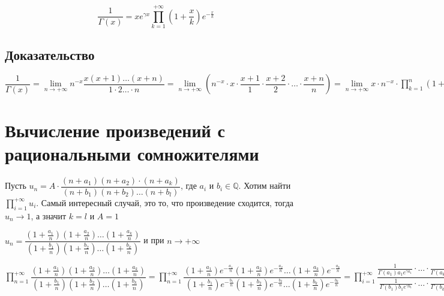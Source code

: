 \documentclass{article}
\begin{document}
            $$\dfrac{1}{\Gamma(x)} = x e^{\gamma x} \prod\limits^{+\infty}_{k = 1} \left( 1 + \dfrac{x}{k} \right) e^{-\frac{x}{k}}$$
            
        \subsection{Доказательство}
        
            $\dfrac{1}{\Gamma(x)} = \lim\limits_{n \rightarrow +\infty} n^{-x} \dfrac{x(x+1)\ldots(x+n)}{1 \cdot 2 \ldots \cdot n} = \lim\limits_{n \rightarrow +\infty} \left( n^{-x} \cdot x \cdot \dfrac{x + 1}{1} \cdot \dfrac{x + 2}{2} \cdot \ldots \cdot \dfrac{x + n}{n} \right) = \lim\limits_{n \rightarrow +\infty} x \cdot n^{-x} \cdot \prod^n_{k = 1} \left( 1 + \frac{x}{k} \right) = \lim\limits_{n \rightarrow +\infty} x e^{x \left(1 + \frac{1}{2} + \ldots + \frac{1}{n} \right)} \cdot e^{-x \ln n} \prod^n_{k = 1} \left( 1 + \dfrac{x}{k} \right) e^{-\frac{x}{k}} = x \cdot e^{\gamma x} \prod^{+\infty}_{k = 1} \left( 1 + \dfrac{x}{k} \right) e^{-\frac{x}{k}}$
            
    \newpage
    
    \section{Вычисление произведений с рациональными сомножителями}

        Пусть $u_n = A \cdot \dfrac{(n + a_1) (n + a_2) \cdot (n + a_k)}{(n + b_1) (n + b_2) \ldots (n + b_l)}$, где $a_i$ и $b_i \in \mathbb{Q}$. Хотим найти $\prod\limits^{+\infty}_{i = 1} u_i$. Самый интересный случай, это то, что произведение сходится, тогда $u_n \rightarrow 1$, а значит $k = l$ и $A = 1$

        $u_n = \dfrac{ \left(1 + \frac{a_1}{n} \right) \left(1 + \frac{a_2}{n} \right) \ldots \left(1 + \frac{a_k}{n} \right)}{\left(1 + \frac{b_1}{n} \right) \left(1 + \frac{b_2}{n} \right) \ldots \left( 1 + \frac{b_k}{n} \right)}$ и при $n \rightarrow +\infty$
        
        $\prod\limits^{+\infty}_{n = 1} \dfrac{ \left(1 + \frac{a_1}{n} \right) \left(1 + \frac{a_2}{n} \right) \ldots \left(1 + \frac{a_k}{n} \right)}{\left(1 + \frac{b_1}{n} \right) \left(1 + \frac{b_2}{n} \right) \ldots \left( 1 + \frac{b_k}{n} \right)} = \prod\limits^{+\infty}_{n = 1} \dfrac{ \left(1 + \frac{a_1}{n} \right) e^{-\frac{a_1}{n}} \left(1 + \frac{a_2}{n} \right) e^{-\frac{a_2}{n}} \ldots \left(1 + \frac{a_k}{n} \right) e^{-\frac{a_k}{n}}}{\left(1 + \frac{b_1}{n} \right) e^{-\frac{b_1}{n}} \left(1 + \frac{b_2}{n} \right) e^{-\frac{b_2}{n}} \ldots \left( 1 + \frac{b_k}{n} \right) e^{-\frac{b_k}{n}}} = \prod\limits^{+\infty}_{i = 1} \dfrac{\frac{1}{\Gamma (a_1) a_1 e^{\gamma a_1}} \cdot \ldots \cdot \frac{1}{\Gamma (a_k) a_k e^{\gamma a_k}}}{\frac{1}{\Gamma (b_1) b_1 e^{\gamma b_1}} \cdot \ldots \cdot \frac{1}{\Gamma (b_k) b_k e^{\gamma b_k}}} = \prod\limits^{+\infty}_{i = 1} \dfrac{\Gamma (1 + b_1) \ldots \Gamma (1 + b_k)}{\Gamma (1 + a_1) \ldots \Gamma(1 + a_k)}$
        
\end{document}
